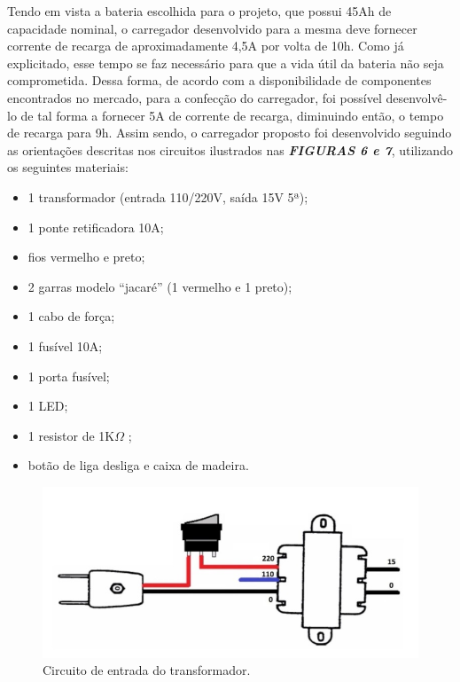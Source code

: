 Tendo em vista a bateria escolhida para o projeto, que possui 45Ah de capacidade nominal, o carregador desenvolvido para a mesma deve fornecer corrente de recarga de aproximadamente 4,5A por volta de 10h. Como já explicitado, esse tempo se faz necessário para que a vida útil da bateria não seja comprometida. Dessa forma, de acordo com a disponibilidade de componentes encontrados no mercado, para a confecção do carregador, foi possível desenvolvê-lo de tal forma a fornecer 5A de corrente de recarga, diminuindo então, o tempo de recarga para 9h. Assim sendo, o carregador proposto foi desenvolvido seguindo as orientações descritas nos circuitos ilustrados nas \textbf{\textit{FIGURAS 6 e 7}}, utilizando os seguintes materiais:

\begin{itemize}
\item 1 transformador (entrada 110/220V, saída 15V 5ª); 
\item 1 ponte retificadora 10A;
\item fios vermelho e preto;
\item 2 garras modelo “jacaré” (1 vermelho e 1 preto);
\item 1 cabo de força;
\item 1 fusível 10A;
\item 1 porta fusível; 
\item 1 LED; 
\item 1 resistor de 1K\(\Omega\) ; 
\item botão de liga desliga e caixa de madeira.
\end{itemize}

\newpage

\begin{figure}[h!]
  \centering
  \includegraphics{figuras/Transformador1.jpg}
  \caption{Circuito de entrada do transformador.}
\end{figure}


